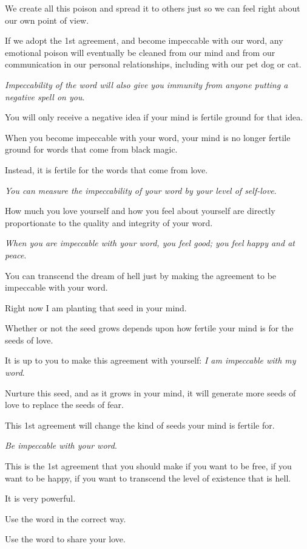 \documentclass{article}
\numberwithin{equation}{section}
\begin{document}
We create all this poison and spread it to others just so we can feel right about our own point of view.

%
If we adopt the 1st agreement, and become impeccable with our word, any emotional poison will eventually be cleaned from our mind and from our communication in our personal relationships, including with our pet dog or cat.

%
\textit{Impeccability of the word will also give you immunity from anyone putting a negative spell on you}.

You will only receive a negative idea if your mind is fertile ground for that idea.

When you become impeccable with your word, your mind is no longer fertile ground for words that come from black magic.

Instead, it is fertile for the words that come from love.

\textit{You can measure the impeccability of your word by your level of self-love}.

How much you love yourself and how you feel about yourself are directly proportionate to the quality and integrity of your word.

\textit{When you are impeccable with your word, you feel good; you feel happy and at peace}.

%
You can transcend the dream of hell just by making the agreement to be impeccable with your word.

Right now I am planting that seed in your mind.

Whether or not the seed grows depends upon how fertile your mind is for the seeds of love.

It is up to you to make this agreement with yourself: \textit{I am impeccable with my word}.

Nurture this seed, and as it grows in your mind, it will generate more seeds of love to replace the seeds of fear.

This 1st agreement will change the kind of seeds your mind is fertile for.

%
\textit{Be impeccable with your word}.

This is the 1st agreement that you should make if you want to be free, if you want to be happy, if you want to transcend the level of existence that is hell.

It is very powerful.

Use the word in the correct way.

Use the word to share your love.
\end{document}
